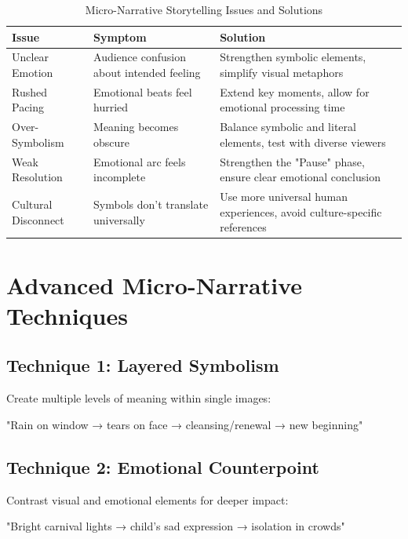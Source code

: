 \begin{table}[H]
\centering
\caption{Micro-Narrative Storytelling Issues and Solutions \\ \authorillustration}
\label{tab:narrative-issues}
\begin{tabular}{p{4cm}p{4cm}p{5cm}}
\hline
\textbf{Issue} & \textbf{Symptom} & \textbf{Solution} \\
\hline
Unclear Emotion & Audience confusion about intended feeling & Strengthen symbolic elements, simplify visual metaphors \\
\hline
Rushed Pacing & Emotional beats feel hurried & Extend key moments, allow for emotional processing time \\
\hline
Over-Symbolism & Meaning becomes obscure & Balance symbolic and literal elements, test with diverse viewers \\
\hline
Weak Resolution & Emotional arc feels incomplete & Strengthen the "Pause" phase, ensure clear emotional conclusion \\
\hline
Cultural Disconnect & Symbols don't translate universally & Use more universal human experiences, avoid culture-specific references \\
\hline
\end{tabular}
\end{table}

\section*{Advanced Micro-Narrative Techniques}

\subsection*{Technique 1: Layered Symbolism}
Create multiple levels of meaning within single images:
\begin{Prompt}
"Rain on window → tears on face → cleansing/renewal → new beginning"
\end{Prompt}

\subsection*{Technique 2: Emotional Counterpoint}
Contrast visual and emotional elements for deeper impact:
\begin{Prompt}
"Bright carnival lights → child's sad expression → isolation in crowds"
\end{Prompt}

